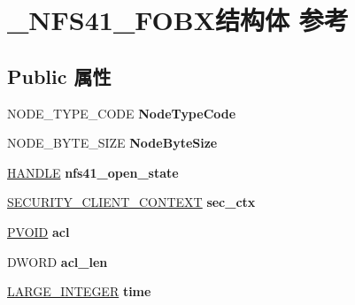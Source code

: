 \hypertarget{struct___n_f_s41___f_o_b_x}{}\section{\+\_\+\+N\+F\+S41\+\_\+\+F\+O\+B\+X结构体 参考}
\label{struct___n_f_s41___f_o_b_x}
\subsection*{Public 属性}
\begin{DoxyCompactItemize}
\item 
\mbox{\label{struct___n_f_s41___f_o_b_x_a83c99d8931bbbd2888cdab455c9111cc}} 
N\+O\+D\+E\+\_\+\+T\+Y\+P\+E\+\_\+\+C\+O\+DE {\bfseries Node\+Type\+Code}
\item 
\mbox{\label{struct___n_f_s41___f_o_b_x_a9e5107339effb7f9069ca59f7b315283}} 
N\+O\+D\+E\+\_\+\+B\+Y\+T\+E\+\_\+\+S\+I\+ZE {\bfseries Node\+Byte\+Size}
\item 
\mbox{\label{struct___n_f_s41___f_o_b_x_a9e113d461d932686b444255dc2b9f991}} 
\hyperlink{interfacevoid}{H\+A\+N\+D\+LE} {\bfseries nfs41\+\_\+open\+\_\+state}
\item 
\mbox{\label{struct___n_f_s41___f_o_b_x_af140abf8081cb7ea51a51dd5ac9700cc}} 
\hyperlink{struct___s_e_c_u_r_i_t_y___c_l_i_e_n_t___c_o_n_t_e_x_t}{S\+E\+C\+U\+R\+I\+T\+Y\+\_\+\+C\+L\+I\+E\+N\+T\+\_\+\+C\+O\+N\+T\+E\+XT} {\bfseries sec\+\_\+ctx}
\item 
\mbox{\label{struct___n_f_s41___f_o_b_x_a5643ced09351b3d48e8944389ad25532}} 
\hyperlink{interfacevoid}{P\+V\+O\+ID} {\bfseries acl}
\item 
\mbox{\label{struct___n_f_s41___f_o_b_x_a00a4fdaf8433fb800023100b7ddadcb5}} 
D\+W\+O\+RD {\bfseries acl\+\_\+len}
\item 
\mbox{\label{struct___n_f_s41___f_o_b_x_aa7065745d2cf08a27d5e2cb6e47ab8e0}} 
\hyperlink{union___l_a_r_g_e___i_n_t_e_g_e_r}{L\+A\+R\+G\+E\+\_\+\+I\+N\+T\+E\+G\+ER} {\bfseries time}
\item 

\end{DoxyCompactItemize}
